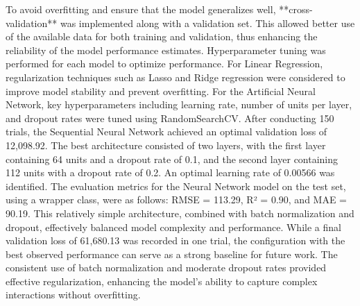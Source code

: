 \documentclass{article}
\begin{document}
To avoid overfitting and ensure that the model generalizes well, **cross-validation** was implemented along with a validation set. This allowed better use of the available data for both training and validation, thus enhancing the reliability of the model performance estimates.
Hyperparameter tuning was performed for each model to optimize performance. For Linear Regression, regularization techniques such as Lasso and Ridge regression were considered to improve model stability and prevent overfitting. For the Artificial Neural Network, key hyperparameters including learning rate, number of units per layer, and dropout rates were tuned using RandomSearchCV. After conducting 150 trials, the Sequential Neural Network achieved an optimal validation loss of 12,098.92. The best architecture consisted of two layers, with the first layer containing 64 units and a dropout rate of 0.1, and the second layer containing 112 units with a dropout rate of 0.2. An optimal learning rate of 0.00566 was identified. The evaluation metrics for the Neural Network model on the test set, using a wrapper class, were as follows: RMSE = 113.29, R² = 0.90, and MAE = 90.19. This relatively simple architecture, combined with batch normalization and dropout, effectively balanced model complexity and performance. While a final validation loss of 61,680.13 was recorded in one trial, the configuration with the best observed performance can serve as a strong baseline for future work. The consistent use of batch normalization and moderate dropout rates provided effective regularization, enhancing the model's ability to capture complex interactions without overfitting.
\end{document}
